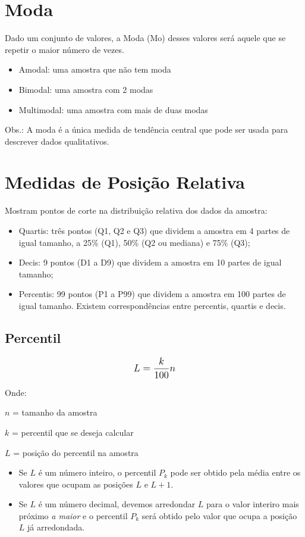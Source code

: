 \section{Moda}

Dado um conjunto de valores, a Moda (Mo) desses valores será aquele que se repetir o maior número de vezes.
\begin{itemize}
	\item Amodal: uma amostra que não tem moda
	\item Bimodal: uma amostra com 2 modas
	\item Multimodal: uma amostra com mais de duas modas
\end{itemize} 

Obs.: A moda é a única medida de tendência central que pode ser usada para descrever dados qualitativos. 

\section{Medidas de Posição Relativa}

Mostram pontos de corte na distribuição relativa dos dados da amostra:

\begin{itemize}
	\item Quartis: três pontos (Q1, Q2 e Q3) que dividem a amostra em 4 partes de igual tamanho, a 25\% (Q1), 50\% (Q2 ou mediana) e 75\% (Q3);
	\item Decis: 9 pontos (D1 a D9) que dividem a amostra em 10 partes  de igual tamanho;
	\item Percentis: 99 pontos (P1 a P99) que dividem a amostra em 100 partes  de igual tamanho. Existem correspondências entre percentis, quartis e decis.
\end{itemize}

\subsection{Percentil}

\[\beq{ L = \frac{k}{100}n }\]

Onde:

\(n\) = tamanho da amostra

\(k\) = percentil que se deseja calcular	

\(L\) = posição do percentil na amostra

\begin{itemize}
    \item Se \(L\) é um número inteiro, o percentil \(P_k\) pode ser obtido pela média 			entre os valores que ocupam as posições \(L\) e \(L+1\).
    \item Se \(L\) é um número decimal, devemos arredondar \(L\) para o valor interiro 			mais próximo \emph{a maior} e o percentil \(P_k\) será obtido pelo valor que ocupa a 		posição \(L\) já arredondada.      
\end{itemize}

